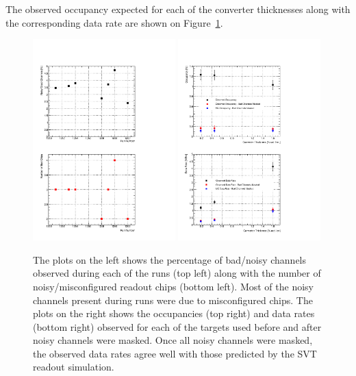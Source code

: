 The observed occupancy expected for each of the converter thicknesses along with the 
corresponding data rate are shown on Figure~\ref{fig:data_rates}.
\begin{figure}[ht]
    \begin{center}
    	\includegraphics[width=0.49\textwidth]{test2012/svtperformance/daq/n_dead_channels_v2.pdf}
    	\includegraphics[width=0.49\textwidth]{test2012/svtperformance/daq/data_rates.pdf}
        \caption{
                    The plots on the left shows the percentage of bad/noisy channels observed
                    during each of the runs (top left) along with the number of noisy/misconfigured 
                    readout chips (bottom left).  Most of the noisy channels present during runs were
                    due to misconfigured chips.  The  plots on the right shows the occupancies (top right)
                    and data rates (bottom right) observed for each of the targets used before and after 
                    noisy channels were masked. Once all noisy channels
                    were masked, the observed data rates agree well with those predicted by the
                    SVT readout simulation. 
                } 
	\label{fig:data_rates}
    \end{center}
\end{figure}

